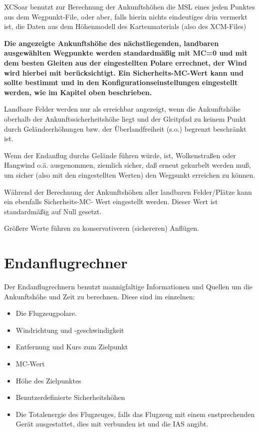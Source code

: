 \textsf{XCSoar} benutzt zur Berechnung der Ankunftshöhen die MSL eines jeden Punktes aus dem Wegpunkt-File, oder aber,
falls hierin nichts eindeutiges drin vermerkt ist, die Daten aus dem Höhenmodell des Kartenmaterials (also des XCM-Files)

\textbf{Die angezeigte Ankunftshöhe  des nächstliegenden, landbaren ausgewählten Wegpunkte werden standardmäßig
mit MC=0  und mit dem besten Gleiten aus der eingestellten Polare errechnet, der Wind wird hierbei mit berücksichtigt.
\warning Ein Sicherheits-MC-Wert kann und sollte bestimmt und in den Konfigurationseinstellungen eingestellt werden, wie im Kapitel
oben beschrieben.}



Landbare Felder werden nur als erreichbar angezeigt, wenn die Ankunftshöhe oberhalb  der Ankunftssicherheitshöhe liegt und der
Gleitpfad zu keinem Punkt durch Geländeerhöhungen bzw. der Überlandfreiheit (s.o.) begrenzt beschränkt ist.


Wenn der Endanflug durchs Gelände führen würde, ist, Wolkenstraßen oder Hangwind o.ä. ausgenommen,
ziemlich sicher, daß erneut gekurbelt werden muß, um sicher (also mit den eingestellten Werten) den
Wegpunkt erreichen zu können.

Während der Berechnung der Ankunftshöhen aller landbaren Felder/Plätze kann ein ebenfalls
Sicherheits-MC- Wert eingestellt werden. Dieser Wert ist standardmäßig auf Null gesetzt.

Größere Werte führen zu konservativeren (sichereren) Anflügen.

\section{Endanflugrechner}

Der Endanflugrechnern benutzt mannigfaltige Informationen und Quellen um die Ankunftshöhe und Zeit zu berechnen.
Diese sind im einzelnen:

\begin{itemize}
\item Die Flugzeugpolare.
\item Windrichtung und -geschwindigkeit
\item Entfernung und Kurs zum Zielpunkt
\item MC-Wert
\item Höhe des Zielpunktes
\item Benutzerdefinierte Sicherheitshöhen
\item Die Totalenergie des Flugzeuges, falls das Flugzeug mit einem enstprechenden Gerät ausgestattet, dies mit \xc
verbunden ist und die IAS angibt.
\end{itemize}

